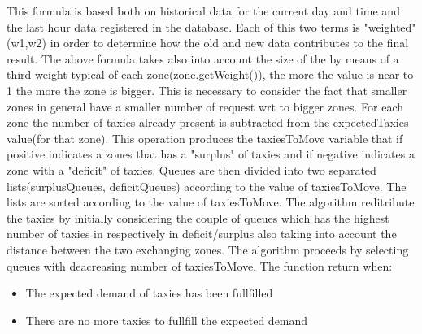\documentclass[11pt,titlepage]{article} %
\begin{document}
  This formula is based both on historical data for the current day and time and
  the last hour data registered in the database.
  Each of this two terms is "weighted" (w1,w2) in order to determine how
  the old and new data contributes to the final result.
  The above formula takes also into account the size of the by means of a third
  weight typical of each zone(zone.getWeight()), the more the value is near to 1
  the more the zone is bigger. This is necessary to consider the fact that smaller
  zones in general have a smaller number of request wrt to bigger zones.
  For each zone the number of taxies already present is subtracted from the
  expectedTaxies value(for that zone). This operation produces the taxiesToMove
  variable that if positive indicates a zones that has a "surplus" of taxies and
  if negative indicates a zone with a "deficit" of taxies.
  Queues are then divided into two separated lists(surplusQueues, deficitQueues)
  according to the value of taxiesToMove.
  The lists are sorted according to the value of taxiesToMove.
  The algorithm reditribute the taxies by initially considering the couple of queues which
  has the highest number of taxies in respectively in deficit/surplus also taking into account
  the distance between the two exchanging zones.
  The algorithm proceeds by selecting queues with deacreasing number of taxiesToMove.
  The function return when:
\begin{itemize}
    \item The expected demand of taxies has been fullfilled
    \item There are no more taxies to fullfill the expected demand
\end{itemize}
\end{document}
